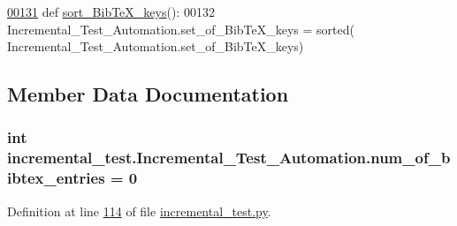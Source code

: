 \begin{DoxyCode}
\hypertarget{classincremental__test_1_1Incremental__Test__Automation_l00131}{}\hyperlink{classincremental__test_1_1Incremental__Test__Automation_a856c60714b5d716d5eb630cbc3d55d09}{00131}     \textcolor{keyword}{def }\hyperlink{classincremental__test_1_1Incremental__Test__Automation_a856c60714b5d716d5eb630cbc3d55d09}{sort\_BibTeX\_keys}():
00132         Incremental\_Test\_Automation.set\_of\_BibTeX\_keys = sorted(
      Incremental\_Test\_Automation.set\_of\_BibTeX\_keys)
\end{DoxyCode}


\subsection{Member Data Documentation}
\hypertarget{classincremental__test_1_1Incremental__Test__Automation_ac60587acca9d28d055bd8a7198a987a1}{}
\subsubsection[{num\+\_\+of\+\_\+bibtex\+\_\+entries}]{\setlength{\rightskip}{0pt plus 5cm}int incremental\+\_\+test.\+Incremental\+\_\+\+Test\+\_\+\+Automation.\+num\+\_\+of\+\_\+bibtex\+\_\+entries = 0\hspace{0.3cm}{\ttfamily [static]}}\label{classincremental__test_1_1Incremental__Test__Automation_ac60587acca9d28d055bd8a7198a987a1}


Definition at line \hyperlink{incremental__test_8py_source_l00114}{114} of file \hyperlink{incremental__test_8py_source}{incremental\+\_\+test.\+py}.

\hypertarget{classincremental__test_1_1Incremental__Test__Automation_a8f5272e0488026aa24a829262392f2f7}{}

